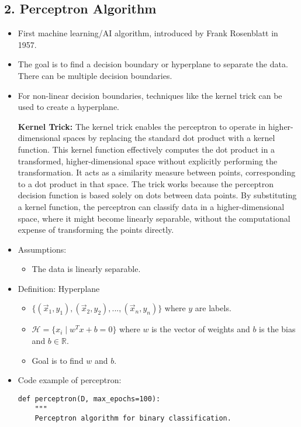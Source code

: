 \subsection*{2. Perceptron Algorithm}
\begin{itemize}
    \item First machine learning/AI algorithm, introduced by Frank Rosenblatt in 1957.
    \item The goal is to find a decision boundary or hyperplane to separate the data. There can be multiple decision boundaries.
    \item For non-linear decision boundaries, techniques like the kernel trick can be used to create a hyperplane.

   \item[\textbf{Kernel Trick:}]  
    The kernel trick enables the perceptron to operate in higher-dimensional spaces by replacing the standard dot product with a kernel function. This kernel function effectively computes the dot product in a transformed, higher-dimensional space without explicitly performing the transformation. It acts as a similarity measure between points, corresponding to a dot product in that space. The trick works because the perceptron decision function is based solely on dots between data points. By substituting a kernel function, the perceptron can classify data in a higher-dimensional space, where it might become linearly separable, without the computational expense of transforming the points directly.
 
    \item Assumptions:
    \begin{itemize}
        \item The data is linearly separable.
    \end{itemize}
    \item Definition: Hyperplane
    \begin{itemize}
        \item $\{(\vec{x}_1,y_1),(\vec{x}_2,y_2),...,(\vec{x}_n,y_n)\}$ where $y$ are labels.
        \item $\mathcal{H}=\{x_i\mid w^Tx+b=0\}$ where $w$ is the vector of weights and $b$ is the bias and $b\in\mathbb{R}$.
        \item Goal is to find $w$ and $b$.
    \end{itemize}

    \item Code example of perceptron:
    \begin{verbatim}
def perceptron(D, max_epochs=100):
    """
    Perceptron algorithm for binary classification.


\end{verbatim}
\end{itemize}
